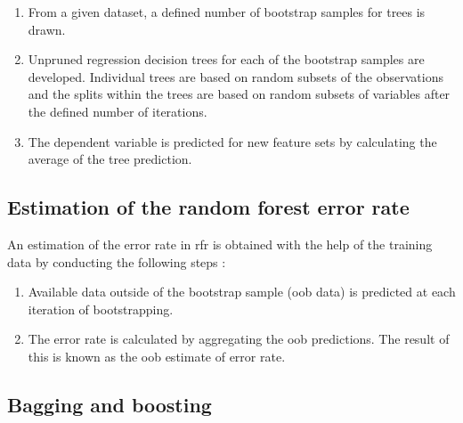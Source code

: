 \documentclass[a4paper, 11pt, oneside]{Thesis}  %
\begin{document}
\begin{enumerate}
\item	From a given dataset, a defined number of bootstrap samples for trees is drawn.
\item Unpruned regression decision trees for each of the bootstrap samples are developed. Individual trees are based on random subsets of the observations and the splits within the trees are based on random subsets of variables after the defined number of iterations.
\item The dependent variable is predicted for new feature sets by calculating the average of the tree prediction.
\end{enumerate}

\subsection{Estimation of the random forest error rate}
An estimation of the error rate in \ac{rfr} is obtained with the help of the training data by conducting the following steps \cite{Liaw.2002}:

\begin{enumerate}
\item Available data outside of the bootstrap sample (\ac{oob} data) is predicted at each iteration of bootstrapping.
\item The error rate is calculated by aggregating the \ac{oob} predictions. The result of this is known as the \ac{oob} estimate of error rate.
\end{enumerate}
 
\subsection{Bagging and boosting}
\end{document}
